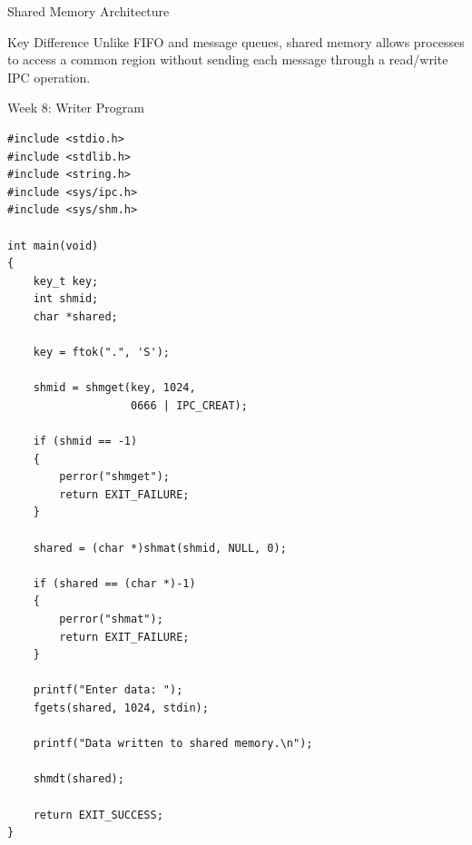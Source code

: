 \documentclass[aspectratio=169,10pt]{beamer}
\begin{document}
\begin{frame}{Shared Memory Architecture}

\begin{center}
\end{center}

\vspace{0.4cm}

\begin{alertblock}{Key Difference}
Unlike FIFO and message queues, shared memory
allows processes to access a common region
without sending each message through a
read/write IPC operation.
\end{alertblock}

\end{frame}

\begin{frame}[fragile]{Week 8: Writer Program}

\begin{lstlisting}[style=cstyle]
#include <stdio.h>
#include <stdlib.h>
#include <string.h>
#include <sys/ipc.h>
#include <sys/shm.h>

int main(void)
{
    key_t key;
    int shmid;
    char *shared;

    key = ftok(".", 'S');

    shmid = shmget(key, 1024,
                   0666 | IPC_CREAT);

    if (shmid == -1)
    {
        perror("shmget");
        return EXIT_FAILURE;
    }

    shared = (char *)shmat(shmid, NULL, 0);

    if (shared == (char *)-1)
    {
        perror("shmat");
        return EXIT_FAILURE;
    }

    printf("Enter data: ");
    fgets(shared, 1024, stdin);

    printf("Data written to shared memory.\n");

    shmdt(shared);

    return EXIT_SUCCESS;
}
\end{lstlisting}

\end{frame}
\end{document}
